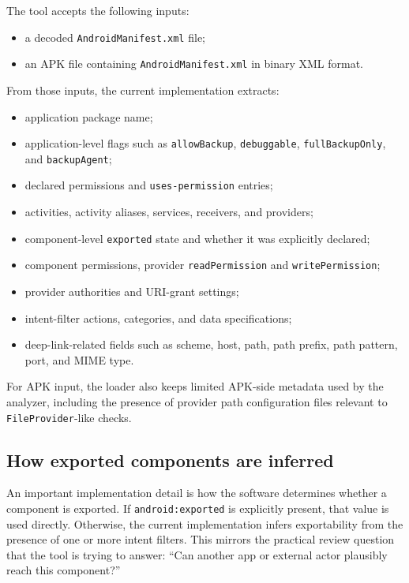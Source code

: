 \documentclass[preprint,12pt,a4paper]{elsarticle}
\begin{document}
The tool accepts the following inputs:

\begin{itemize}[leftmargin=*]
\item a decoded \texttt{AndroidManifest.xml} file;
\item an APK file containing \texttt{AndroidManifest.xml} in binary XML format.
\end{itemize}

From those inputs, the current implementation extracts:

\begin{itemize}[leftmargin=*]
\item application package name;
\item application-level flags such as \texttt{allowBackup}, \texttt{debuggable}, \texttt{fullBackupOnly}, and \texttt{backupAgent};
\item declared permissions and \texttt{uses-permission} entries;
\item activities, activity aliases, services, receivers, and providers;
\item component-level \texttt{exported} state and whether it was explicitly declared;
\item component permissions, provider \texttt{readPermission} and \texttt{writePermission};
\item provider authorities and URI-grant settings;
\item intent-filter actions, categories, and data specifications;
\item deep-link-related fields such as scheme, host, path, path prefix, path pattern, port, and MIME type.
\end{itemize}

For APK input, the loader also keeps limited APK-side metadata used by the analyzer, including the presence of provider path configuration files relevant to \texttt{FileProvider}-like checks.

\subsection{How exported components are inferred}

An important implementation detail is how the software determines whether a component is exported. If \texttt{android:exported} is explicitly present, that value is used directly. Otherwise, the current implementation infers exportability from the presence of one or more intent filters. This mirrors the practical review question that the tool is trying to answer: ``Can another app or external actor plausibly reach this component?''
\end{document}
